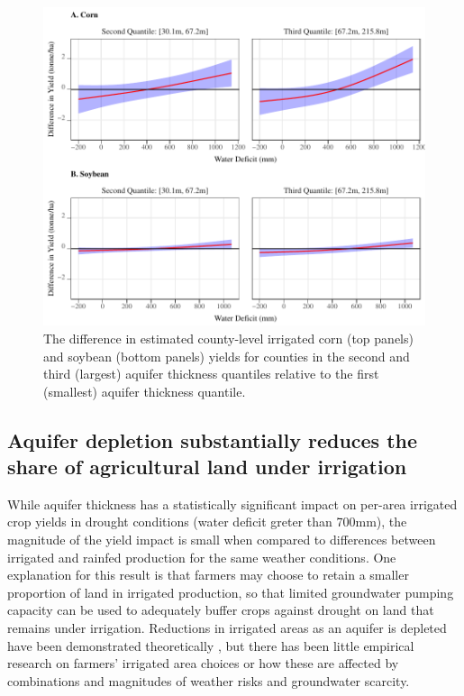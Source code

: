 \documentclass[
]{article}
\begin{document}
\begin{figure}[H]

{\centering \includegraphics[width=6in,]{Figures/g_ir_yield_dif} 

}

\caption{The difference in estimated county-level irrigated corn (top panels) and soybean (bottom panels) yields for counties in the second and third (largest) aquifer thickness quantiles relative to the first (smallest) aquifer thickness quantile.}\label{fig:yield-dif}
\end{figure}

\hypertarget{impact-share}{%
\subsection{Aquifer depletion substantially reduces the share of agricultural land under irrigation}\label{impact-share}}

While aquifer thickness has a statistically significant impact on per-area irrigated crop yields in drought conditions (water deficit greter than 700mm), the magnitude of the yield impact is small when compared to differences between irrigated and rainfed production for the same weather conditions. One explanation for this result is that farmers may choose to retain a smaller proportion of land in irrigated production, so that limited groundwater pumping capacity can be used to adequately buffer crops against drought on land that remains under irrigation. Reductions in irrigated areas as an aquifer is depleted have been demonstrated theoretically \citep{rad2020effects, foster2014modeling, hrozencik2017heterogeneous, deines2020transitions}, but there has been little empirical research on farmers' irrigated area choices or how these are affected by combinations and magnitudes of weather risks and groundwater scarcity.
\end{document}
